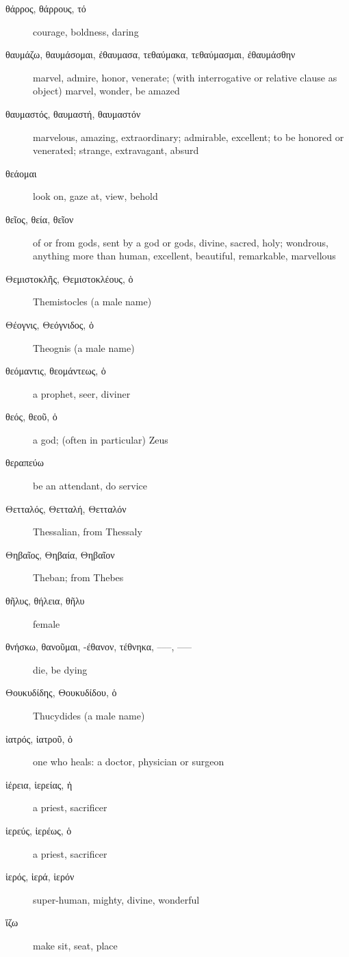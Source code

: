 \documentclass[12pt,letterpaper]{article}
\begin{document}
\begin{description}
    \item[\textgreek{θάρρος, θάρρους, τό}] courage, boldness, daring
    \item[\textgreek{θαυμάζω, θαυμάσομαι, ἐθαυμασα, τεθαύμακα, τεθαύμασμαι, ἐθαυμάσθην}] \marginnote{*}marvel, admire, honor, venerate; (with interrogative or relative clause as object) marvel, wonder, be amazed
    \item[\textgreek{θαυμαστός, θαυμαστή, θαυμαστόν}] marvelous, amazing, extraordinary; admirable, excellent; to be honored or venerated; strange, extravagant, absurd
    \item[\textgreek{θεάομαι}] look on, gaze at, view, behold
    \item[\textgreek{θεῖος, θεία, θεῖον}] \marginnote{*}of or from gods, sent by a god or gods, divine, sacred, holy; wondrous, anything more than human, excellent, beautiful, remarkable, marvellous
    \item[\textgreek{Θεμιστοκλῆς, Θεμιστοκλέους, ὁ}] Themistocles (a male name)
    \item[\textgreek{Θέογνις, Θεόγνιδος, ὁ}] Theognis (a male name)
    \item[\textgreek{θεόμαντις, θεομάντεως, ὁ}] a prophet, seer, diviner
    \item[\textgreek{θεός, θεοῦ, ὁ}] \marginnote{*}a god; (often in particular) Zeus
    \item[\textgreek{θεραπεύω}] be an attendant, do service
    \item[\textgreek{Θετταλός, Θετταλή, Θετταλόν}] Thessalian, from Thessaly
    \item[\textgreek{Θηβαῖος, Θηβαία, Θηβαῖον}] Theban; from Thebes
    \item[\textgreek{θῆλυς, θήλεια, θῆλυ}] female
    \item[\textgreek{θνήσκω, θανοῦμαι, -έθανον, τέθνηκα, –––, –––}] \marginnote{*}die, be dying
    \item[\textgreek{Θουκυδίδης, Θουκυδίδου, ὁ}] Thucydides (a male name)
    \item[\textgreek{ἰατρός, ἰατροῦ, ὁ}] one who heals: a doctor, physician or surgeon
    \item[\textgreek{ἱέρεια, ἱερείας, ἡ}] a priest, sacrificer
    \item[\textgreek{ἱερεύς, ἱερέως, ὁ}] a priest, sacrificer
    \item[\textgreek{ἱερός, ἱερά, ἱερόν}] \marginnote{*}super-human, mighty, divine, wonderful
    \item[\textgreek{ἵζω}] make sit, seat, place

\end{description}
\end{document}
